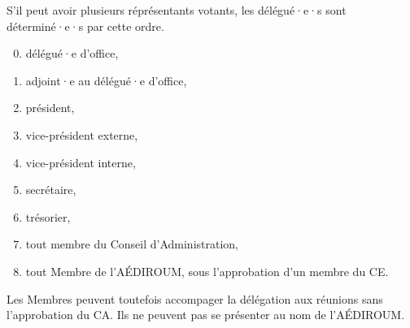 \documentclass{aediroum}
\begin{document}
S'il peut avoir plusieurs réprésentants votants, les délégué·e·s sont déterminé·e·s par cette ordre.

\begin{enumerate}\setcounter{enumi}{-1}
\item délégué·e d'office,
\item adjoint·e au délégué·e d'office,
\item président,
\item vice-président externe,
\item vice-président interne,
\item secrétaire,
\item trésorier,
\item tout membre du Conseil d'Administration,
\item tout Membre de l'AÉDIROUM, sous l'approbation d'un membre du CE.
\end{enumerate}

Les Membres peuvent toutefois accompager la délégation aux réunions sans l'approbation du CA. Ils ne peuvent pas se présenter au nom de l'AÉDIROUM.
\end{document}
